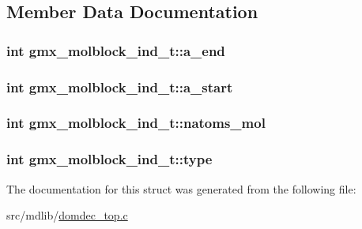 \subsection{\-Member \-Data \-Documentation}
\hypertarget{structgmx__molblock__ind__t_a7497ca2e90f8b16ae08a498b3cdd011a}{
\subsubsection[{a\-\_\-end}]{\setlength{\rightskip}{0pt plus 5cm}int {\bf gmx\-\_\-molblock\-\_\-ind\-\_\-t\-::a\-\_\-end}}}\label{structgmx__molblock__ind__t_a7497ca2e90f8b16ae08a498b3cdd011a}
\hypertarget{structgmx__molblock__ind__t_a18012b7c71885f3c6780857b07f95d03}{
\subsubsection[{a\-\_\-start}]{\setlength{\rightskip}{0pt plus 5cm}int {\bf gmx\-\_\-molblock\-\_\-ind\-\_\-t\-::a\-\_\-start}}}\label{structgmx__molblock__ind__t_a18012b7c71885f3c6780857b07f95d03}
\hypertarget{structgmx__molblock__ind__t_a51d1aa31332d8e6363c88b2799738c73}{
\subsubsection[{natoms\-\_\-mol}]{\setlength{\rightskip}{0pt plus 5cm}int {\bf gmx\-\_\-molblock\-\_\-ind\-\_\-t\-::natoms\-\_\-mol}}}\label{structgmx__molblock__ind__t_a51d1aa31332d8e6363c88b2799738c73}
\hypertarget{structgmx__molblock__ind__t_ab475692e4cc909fa0f61fde577fe0e0a}{
\subsubsection[{type}]{\setlength{\rightskip}{0pt plus 5cm}int {\bf gmx\-\_\-molblock\-\_\-ind\-\_\-t\-::type}}}\label{structgmx__molblock__ind__t_ab475692e4cc909fa0f61fde577fe0e0a}


\-The documentation for this struct was generated from the following file\-:\begin{DoxyCompactItemize}
\item 
src/mdlib/\hyperlink{domdec__top_8c}{domdec\-\_\-top.\-c}\end{DoxyCompactItemize}
